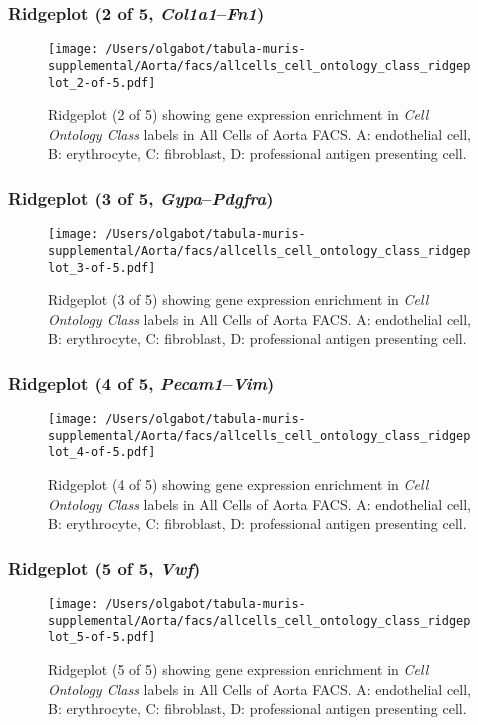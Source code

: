 \clearpage

\subsubsection{Ridgeplot (2 of 5, \emph{Col1a1}--\emph{Fn1})}
\begin{figure}[h]
\centering
\texttt{[image: /Users/olgabot/tabula-muris-supplemental/Aorta/facs/allcells\_cell\_ontology\_class\_ridgeplot\_2-of-5.pdf]}

\caption{ Ridgeplot (2 of 5)  showing gene expression enrichment in \emph{Cell Ontology Class} labels in All Cells of Aorta FACS. A: endothelial cell, B: erythrocyte, C: fibroblast, D: professional antigen presenting cell.}
\end{figure}


\clearpage

\subsubsection{Ridgeplot (3 of 5, \emph{Gypa}--\emph{Pdgfra})}
\begin{figure}[h]
\centering
\texttt{[image: /Users/olgabot/tabula-muris-supplemental/Aorta/facs/allcells\_cell\_ontology\_class\_ridgeplot\_3-of-5.pdf]}

\caption{ Ridgeplot (3 of 5)  showing gene expression enrichment in \emph{Cell Ontology Class} labels in All Cells of Aorta FACS. A: endothelial cell, B: erythrocyte, C: fibroblast, D: professional antigen presenting cell.}
\end{figure}


\clearpage

\subsubsection{Ridgeplot (4 of 5, \emph{Pecam1}--\emph{Vim})}
\begin{figure}[h]
\centering
\texttt{[image: /Users/olgabot/tabula-muris-supplemental/Aorta/facs/allcells\_cell\_ontology\_class\_ridgeplot\_4-of-5.pdf]}

\caption{ Ridgeplot (4 of 5)  showing gene expression enrichment in \emph{Cell Ontology Class} labels in All Cells of Aorta FACS. A: endothelial cell, B: erythrocyte, C: fibroblast, D: professional antigen presenting cell.}
\end{figure}


\clearpage

\subsubsection{Ridgeplot (5 of 5, \emph{Vwf})}
\begin{figure}[h]
\centering
\texttt{[image: /Users/olgabot/tabula-muris-supplemental/Aorta/facs/allcells\_cell\_ontology\_class\_ridgeplot\_5-of-5.pdf]}

\caption{ Ridgeplot (5 of 5)  showing gene expression enrichment in \emph{Cell Ontology Class} labels in All Cells of Aorta FACS. A: endothelial cell, B: erythrocyte, C: fibroblast, D: professional antigen presenting cell.}
\end{figure}



